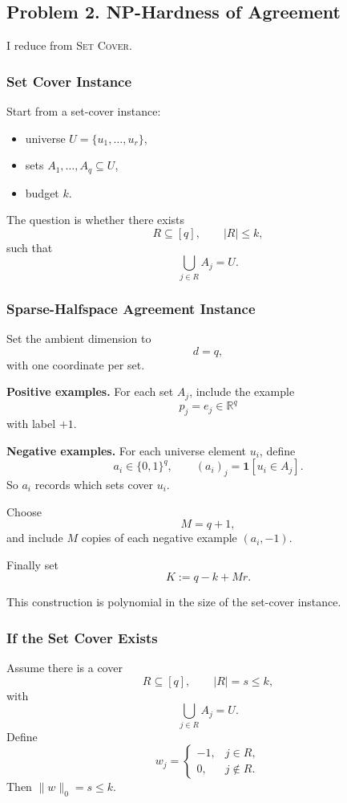 \documentclass{article}
\newcommand{\one}{\mathbf{1}}
\begin{document}
\subsection{Problem 2. NP-Hardness of Agreement}

I reduce from \textsc{Set Cover}.

\subsubsection{Set Cover Instance}

Start from a set-cover instance:
\begin{itemize}
\item universe $U=\{u_1,\dots,u_r\}$,
\item sets $A_1,\dots,A_q \subseteq U$,
\item budget $k$.
\end{itemize}
The question is whether there exists
$$
R\subseteq[q],
\qquad
|R|\le k,
$$
such that
$$
\bigcup_{j\in R} A_j = U.
$$

\subsubsection{Sparse-Halfspace Agreement Instance}

Set the ambient dimension to
$$
d=q,
$$
with one coordinate per set.

\textbf{Positive examples.}
For each set $A_j$, include the example
$$
p_j=e_j \in \mathbb{R}^q
$$
with label $+1$.

\textbf{Negative examples.}
For each universe element $u_i$, define
$$
a_i \in \{0,1\}^q,
\qquad
(a_i)_j = \one[u_i \in A_j].
$$
So $a_i$ records which sets cover $u_i$.

Choose
$$
M=q+1,
$$
and include $M$ copies of each negative example $(a_i,-1)$.

Finally set
$$
K := q-k+Mr.
$$

This construction is polynomial in the size of the set-cover instance.

\subsubsection{If the Set Cover Exists}

Assume there is a cover
$$
R\subseteq[q],
\qquad
|R|=s\le k,
$$
with
$$
\bigcup_{j\in R} A_j = U.
$$
Define
$$
w_j =
\begin{cases}
-1, & j\in R,\\
0, & j\notin R.
\end{cases}
$$
Then $\|w\|_0=s\le k$.
\end{document}
